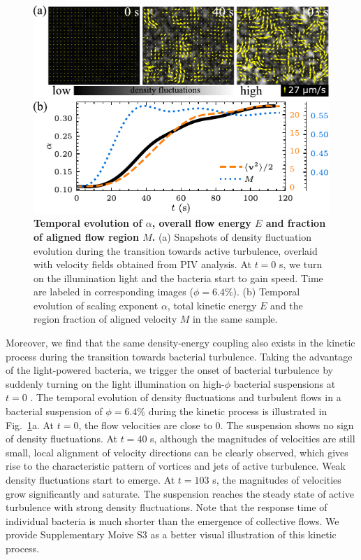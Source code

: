 \begin{figure}[!ht]
\begin{center}
\includegraphics[width=4.5in]{figs/5-GNF/7.pdf}
\caption[Temporal evolution of $\alpha$, overall flow energy $E$ and fraction of aligned flow region $M$]
{
\textbf{Temporal evolution of $\alpha$, overall flow energy $E$ and fraction of aligned flow region $M$.}
(a) Snapshots of density fluctuation evolution during the transition towards active turbulence, overlaid with velocity fields obtained from PIV analysis. At $t=0$ s, we turn on the illumination light and the bacteria start to gain speed. Time are labeled in corresponding images ($\phi=6.4\%$).
(b) Temporal evolution of scaling exponent $\alpha$, total kinetic energy $E$ and the region fraction of aligned velocity $M$ in the same sample.
}
\label{fig:alpha-kinetics}
\end{center}
\end{figure}


Moreover, we find that the same density-energy coupling also exists in the kinetic process during the transition towards bacterial turbulence. Taking the advantage of the light-powered bacteria, we trigger the onset of bacterial turbulence by suddenly turning on the light illumination on high-$\phi$ bacterial suspensions at $t=0$ \cite{Peng2020}.
The temporal evolution of density fluctuations and turbulent flows in a bacterial suspension of $\phi = 6.4\%$ during the kinetic process is illustrated in Fig.~\ref{fig:alpha-kinetics}a. At $t=0$, the flow velocities are close to 0. The suspension shows no sign of density fluctuations. At $t=40$ s, although the magnitudes of velocities are still small, local alignment of velocity directions can be clearly observed, which gives rise to the characteristic pattern of vortices and jets of active turbulence. Weak density fluctuations start to emerge. At $t=103$ s, the magnitudes of velocities grow significantly and saturate. The suspension reaches the steady state of active turbulence with strong density fluctuations. Note that the response time of individual bacteria is much shorter than the emergence of collective flows. We provide Supplementary Moive S3 \cite{suppMovies} as a better visual illustration of this kinetic process.


